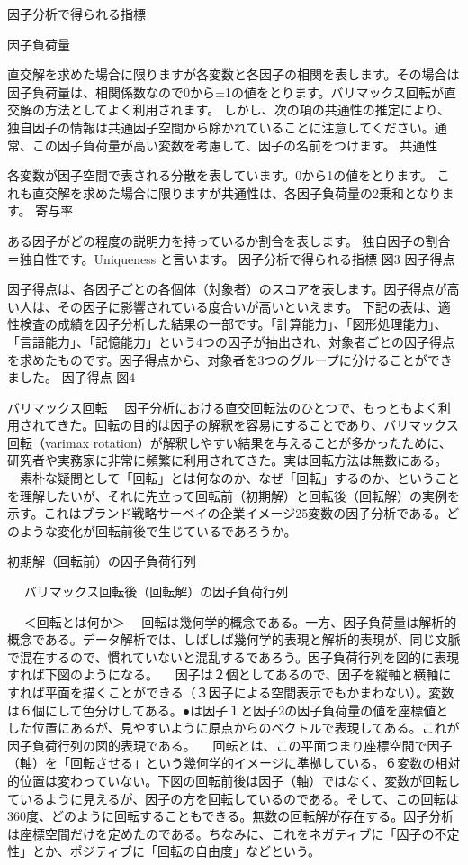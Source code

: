 \documentclass[a4j,11pt,mc, twocolumn]{jreport}
\begin{document}
	因子分析で得られる指標

	因子負荷量

	直交解を求めた場合に限りますが各変数と各因子の相関を表します。その場合は因子負荷量は、相関係数なので0から±1の値をとります。バリマックス回転が直交解の方法としてよく利用されます。
	しかし、次の項の共通性の推定により、独自因子の情報は共通因子空間から除かれていることに注意してください。通常、この因子負荷量が高い変数を考慮して、因子の名前をつけます。
	共通性

	各変数が因子空間で表される分散を表しています。0から1の値をとります。
	これも直交解を求めた場合に限りますが共通性は、各因子負荷量の2乗和となります。
	寄与率

	ある因子がどの程度の説明力を持っているか割合を表します。
	独自因子の割合＝独自性です。Uniqueness と言います。
	因子分析で得られる指標
	図3
	因子得点

	因子得点は、各因子ごとの各個体（対象者）のスコアを表します。因子得点が高い人は、その因子に影響されている度合いが高いといえます。
	下記の表は、適性検査の成績を因子分析した結果の一部です。「計算能力」、「図形処理能力」、「言語能力」、「記憶能力」という4つの因子が抽出され、対象者ごとの因子得点を求めたものです。因子得点から、対象者を3つのグループに分けることができました。
	因子得点
	図4







	バリマックス回転
	　因子分析における直交回転法のひとつで、もっともよく利用されてきた。回転の目的は因子の解釈を容易にすることであり、バリマックス回転（varimax rotation）が解釈しやすい結果を与えることが多かったために、研究者や実務家に非常に頻繁に利用されてきた。実は回転方法は無数にある。
	　素朴な疑問として「回転」とは何なのか、なぜ「回転」するのか、ということを理解したいが、それに先立って回転前（初期解）と回転後（回転解）の実例を示す。これはブランド戦略サーベイの企業イメージ25変数の因子分析である。どのような変化が回転前後で生じているであろうか。

	初期解（回転前）の因子負荷行列　

	　
	バリマックス回転後（回転解）の因子負荷行列

	　
	＜回転とは何か＞
	　回転は幾何学的概念である。一方、因子負荷量は解析的概念である。データ解析では、しばしば幾何学的表現と解析的表現が、同じ文脈で混在するので、慣れていないと混乱するであろう。因子負荷行列を図的に表現すれば下図のようになる。
	　因子は２個としてあるので、因子を縦軸と横軸にすれば平面を描くことができる（３因子による空間表示でもかまわない）。変数は６個にして色分けしてある。●は因子１と因子2の因子負荷量の値を座標値とした位置にあるが、見やすいように原点からのベクトルで表現してある。これが因子負荷行列の図的表現である。
	　回転とは、この平面つまり座標空間で因子（軸）を「回転させる」という幾何学的イメージに準拠している。６変数の相対的位置は変わっていない。下図の回転前後は因子（軸）ではなく、変数が回転しているように見えるが、因子の方を回転しているのである。そして、この回転は360度、どのように回転することもできる。無数の回転解が存在する。因子分析は座標空間だけを定めたのである。ちなみに、これをネガティブに「因子の不定性」とか、ポジティブに「回転の自由度」などという。
\end{document}

